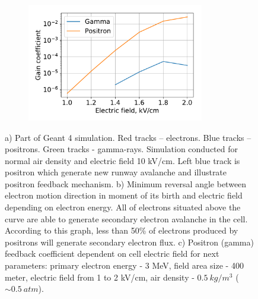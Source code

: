 \documentclass[utf8]{webofc}
\begin{document}
\begin{figure}[t]
\begin{minipage}[b][\ht\leftpic][s]{0.5\linewidth}
\begin{center}
            \end{center}      
            \vfill
            
            \begin{center}
                \begin{subfigure}[b]{\textwidth}
                    \includegraphics[width=0.85\textwidth]{pictures/08_gain}
                    \caption{}
                    \label{pic-gain-a}
                \end{subfigure}
                
            \end{center}
        \end{minipage}
        \caption{ a) Part of Geant 4 simulation. Red tracks – electrons. Blue tracks – positrons. Green tracks - gamma-rays. Simulation conducted for normal air density and electric field 10 kV/cm. Left blue track is positron which generate new runway avalanche and illustrate positron feedback mechanism.
            b) Minimum reversal angle between electron motion direction in moment of its birth and electric field depending on electron energy. All of electrons situated above the curve are able to generate secondary electron avalanche in the cell. According to this graph, less than 50\% of electrons produced by positrons will generate secondary electron flux.
            c) Positron (gamma) feedback coefficient dependent on cell electric field for next parameters: primary electron energy - 3 MeV, field area size - 400 meter, electric field from 1 to 2 kV/cm, air density - $0.5~kg/m^3$ ($\sim 0.5~atm$).
        }    
    \end{figure}
    
\end{document}
